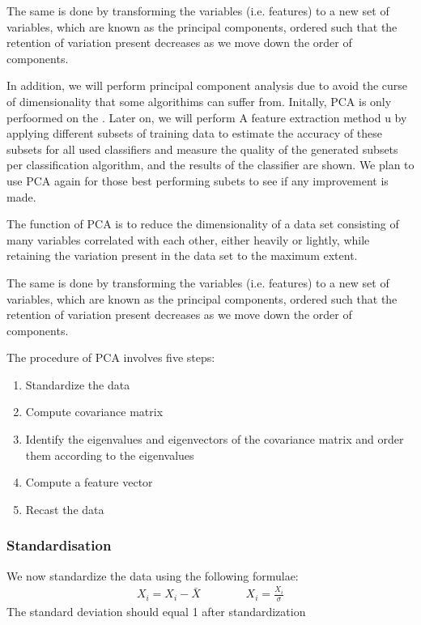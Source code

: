 \documentclass[letterpaper,10pt,english]{jupyterBook}
\begin{document}
\sphinxAtStartPar
The same is done by transforming the variables (i.e. features) to a new set of variables, which are known as the principal components, ordered such that the retention of variation present decreases as we move down the order of components.

\sphinxAtStartPar
In addition, we will perform principal component analysis due to avoid the curse of dimensionality that some algorithims can suffer from. Initally, PCA is only perfoormed on the . Later on,  we will perform A feature extraction method u by applying different subsets  of training  data to estimate the accuracy of these subsets for all used
classifiers and measure the quality of the generated subsets  per classification algorithm, and the results of the classifier are shown. We plan to use PCA again for those best performing subets to see if any improvement is made.

\sphinxAtStartPar
The function of PCA is to reduce the dimensionality of a data set consisting of many variables correlated with each other,
either heavily or lightly, while retaining the variation present in the data set to the maximum extent.

\sphinxAtStartPar
The same is done by transforming the variables (i.e. features) to a new set of variables, which are known as the principal components, ordered such that the retention of variation present decreases as we move down the order of components.

\sphinxAtStartPar
The procedure of PCA involves five steps: 
\begin{enumerate}
%
\item {} 
\sphinxAtStartPar
Standardize the data 

\item {} 
\sphinxAtStartPar
Compute covariance matrix 

\item {} 
\sphinxAtStartPar
Identify the eigenvalues and eigenvectors of the covariance matrix and order them according to the eigenvalues 

\item {} 
\sphinxAtStartPar
Compute a feature vector 

\item {} 
\sphinxAtStartPar
Recast the data 

\end{enumerate}


\subsubsection{Standardisation}
\label{\detokenize{Initial_Data_Exploration:standardisation}}
\sphinxAtStartPar
We now standardize the data using the following formulae:
\begin{equation*}
\begin{split}
X_i = X_i - \bar{X}~~~~~~~~~~~~~~~~~~X_i = \frac{X_i}{\sigma}
\end{split}
\end{equation*}
\sphinxAtStartPar
The standard deviation should equal 1 after standardization
\end{document}
